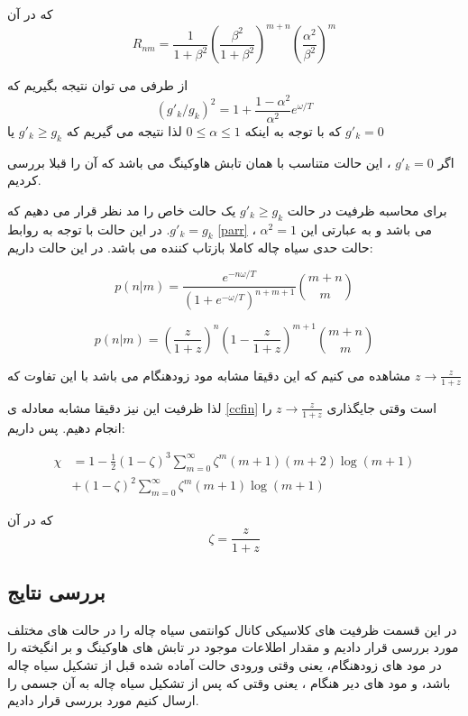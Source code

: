 که در آن
\begin{equation}
	R_{nm} = \frac{1}{1+\beta^2} (\frac{\beta^2}{1+\beta^2})^{m+n} (\frac{\alpha^2}{\beta^2})^m
\end{equation}

از طرفی می توان نتیجه بگیریم که 
\begin{equation}
	(g'_k/g_k)^2 = 1 + \frac{1-\alpha^2}{\alpha^2} e^{\omega/T}
\end{equation}
که با توجه به اینکه 
$0 \leq \alpha \leq 1$
لذا نتیجه می گیریم که
$g'_k \geq g_k$
یا 
$g'_k = 0$

اگر 
$g'_k = 0$
، این حالت متناسب با همان تابش هاوکینگ می باشد
\cite{cit}
که آن را قبلا بررسی کردیم.

برای محاسبه ظرفیت در حالت
$g'_k \geq g_k$
 یک حالت خاص را مد نظر قرار می دهیم که  
$g'_k = g_k$.
در این حالت با توجه به روابط 
\ref{parr}
،
$\alpha^2 =1$
می باشد و به عبارتی این حالت حدی سیاه چاله کاملا بازتاب کننده می باشد. در این حالت داریم:

\begin{equation}
p(n|m) = \frac{e^{-n\omega/T}}{(1+e^{-\omega/T})^{n+m+1}} \binom{m+n}{m}
\end{equation}

\begin{equation}
	p(n|m) = (\frac{z}{1+z})^n (1- \frac{z}{1+z})^{m+1} \binom{m+n}{m}
\end{equation}

مشاهده می کنیم که این دقیقا مشابه مود زودهنگام می باشد با این تفاوت که 
$z \to \frac{z}{1+z}$

لذا ظرفیت این نیز دقیقا مشابه معادله ی 
\ref{ccfin}
است وقتی  جایگذاری
$z \to \frac{z}{1+z}$
را انجام دهیم. پس داریم:

\begin{align}
	\chi &= 1 - \frac{1}{2} (1-\zeta)^3 \sum_{m=0}^{\infty}  \zeta^m (m+1)(m+2) \log (m+1) \\
	& + (1-\zeta)^2 \sum_{m=0}^{\infty} \zeta^m (m+1) \log (m+1)
\end{align}

که در آن
\begin{equation}
	\zeta = \frac{z}{1+z}
\end{equation}

\subsection{بررسی نتایج}
در این قسمت ظرفیت های کلاسیکی کانال کوانتمی سیاه چاله را در حالت های مختلف مورد بررسی قرار دادیم و مقدار اطلاعات موجود در تابش های هاوکینگ و بر انگیخته را در مود های زودهنگام، یعنی وقتی ورودی حالت آماده شده قبل از تشکیل سیاه چاله باشد، و مود های دیر هنگام ، یعنی وقتی که پس از تشکیل سیاه چاله به آن جسمی را ارسال کنیم مورد بررسی قرار دادیم.

